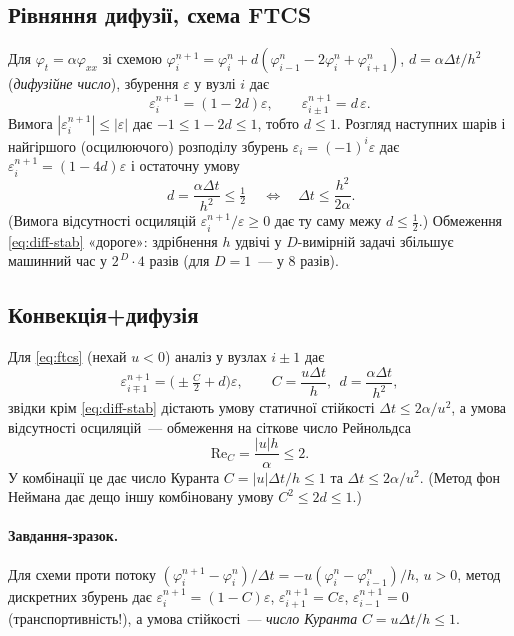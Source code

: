 \documentclass[12pt,a4paper]{article}
\theoremstyle{definition}
\theoremstyle{plain}
\newcommand{\abs}[1]{\left\lvert #1 \right\rvert}
\begin{document}
\subsection{Рівняння дифузії, схема FTCS}
Для $\varphi_t=\alpha\varphi_{xx}$ зі схемою
$\varphi_i^{n+1}=\varphi_i^n+d(\varphi_{i-1}^n-2\varphi_i^n+\varphi_{i+1}^n)$,
\;$d=\alpha\Delta t/h^2$ (\emph{дифузійне число}), збурення $\varepsilon$
у вузлі $i$ дає
\[
  \varepsilon_i^{n+1}=(1-2d)\varepsilon,\qquad
  \varepsilon_{i\pm1}^{n+1}=d\,\varepsilon .
\]
Вимога $\abs{\varepsilon_i^{n+1}}\le\abs{\varepsilon}$ дає
$-1\le1-2d\le1$, тобто $d\le1$. Розгляд наступних шарів і найгіршого
(осцилюючого) розподілу збурень $\varepsilon_i=(-1)^i\varepsilon$ дає
$\varepsilon_i^{n+1}=(1-4d)\varepsilon$ і остаточну умову
\begin{equation}
  \boxed{\,d=\frac{\alpha\Delta t}{h^2}\le\tfrac12\,}\quad\Longleftrightarrow\quad
  \Delta t\le\frac{h^2}{2\alpha}.
  \label{eq:diff-stab}
\end{equation}
(Вимога відсутності осциляцій $\varepsilon_i^{n+1}/\varepsilon\ge0$ дає
ту саму межу $d\le\tfrac12$.) Обмеження \eqref{eq:diff-stab} «дороге»:
здрібнення $h$ удвічі у $D$-вимірній задачі збільшує машинний час у
$2^{\,D}\cdot 4$ разів (для $D=1$~--- у $8$ разів).

\subsection{Конвекція{+}дифузія}
Для \eqref{eq:ftcs} (нехай $u<0$) аналіз у вузлах $i\pm1$ дає
\[
  \varepsilon_{i\mp1}^{n+1}=\Big(\pm\tfrac{C}{2}+d\Big)\varepsilon,
  \qquad C=\frac{u\Delta t}{h},\ \ d=\frac{\alpha\Delta t}{h^2},
\]
звідки крім \eqref{eq:diff-stab} дістають умову статичної стійкості
$\Delta t\le 2\alpha/u^2$, а умова відсутності осциляцій~--- обмеження на
сіткове число Рейнольдса
\begin{equation}
  \mathrm{Re}_C=\frac{\abs{u}h}{\alpha}\le2 .
\end{equation}
У комбінації це дає число Куранта $C=\abs{u}\Delta t/h\le1$ та
$\Delta t\le2\alpha/u^2$. (Метод фон Неймана дає дещо іншу комбіновану
умову $C^2\le2d\le1$.)

\paragraph{Завдання-зразок.} Для схеми проти потоку
$(\varphi_i^{n+1}-\varphi_i^n)/\Delta t=-u(\varphi_i^n-\varphi_{i-1}^n)/h$,
$u>0$, метод дискретних збурень дає
$\varepsilon_i^{n+1}=(1-C)\varepsilon$, $\varepsilon_{i+1}^{n+1}=C\varepsilon$,
$\varepsilon_{i-1}^{n+1}=0$ (транспортивність!), а умова стійкості~---
\emph{число Куранта} $C=u\Delta t/h\le1$.
\end{document}
